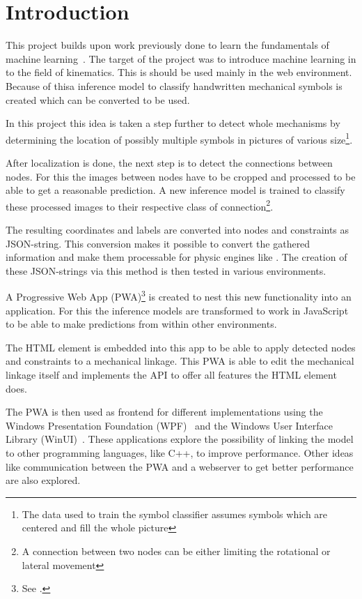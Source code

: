 \section{Introduction}

This project builds upon work previously done to learn the fundamentals of machine learning~\cite{Lawrence2020}.
The target of the project was to introduce machine learning in to the field of kinematics.
This is should be used mainly in the web environment.
Because of thisa inference model to classify handwritten mechanical symbols is created which can be converted to be used.

In this project this idea is taken a step further to detect whole mechanisms by determining the location of possibly multiple symbols in pictures of various size\footnote{The data used to train the symbol classifier assumes symbols which are centered and fill the whole picture}.

After localization is done, the next step is to detect the connections between nodes.
For this the images between nodes have to be cropped and processed to be able to get a reasonable prediction.
A new inference model is trained to classify these processed images to their respective class of connection\footnote{A connection between two nodes can be either limiting the rotational or lateral movement}.

The resulting coordinates and labels are converted into  nodes and constraints as JSON-string.
This conversion makes it possible to convert the gathered information and make them processable for physic engines like .
The creation of these JSON-strings via this method is then tested in various environments.

A Progressive Web App (PWA)\footnote{See .} is created to nest this new functionality into an application.
For this the inference models are transformed to work in JavaScript to be able to make predictions from within other environments.

The  HTML element is embedded into this app to be able to apply detected nodes and constraints to a mechanical linkage.
This PWA is able to edit the mechanical linkage itself and implements the  API to offer all features the  HTML element does.

The PWA is then used as frontend for different implementations using the Windows Presentation Foundation (WPF)~\cite{Microsoft2021} and the Windows User Interface Library (WinUI)~\cite{Microsoft2021a}.
These applications explore the possibility of linking the model to other programming languages, like C++, to improve performance.
Other ideas like communication between the PWA and a webserver to get better performance are also explored.

